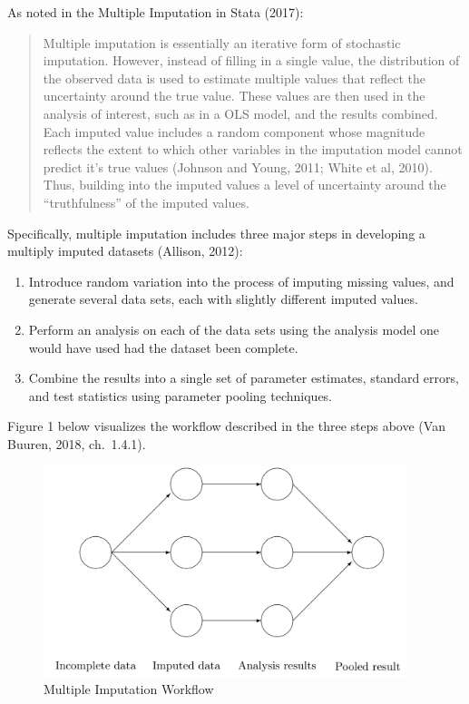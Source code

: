 \documentclass[12pt,oneside]{chicagocapstone}
\providecommand{\tightlist}{%
  \setlength{\itemsep}{0pt}\setlength{\parskip}{0pt}}
\begin{document}
As noted in the Multiple Imputation in Stata (2017):
\begin{quote}
Multiple imputation is essentially an iterative form of stochastic
imputation. However, instead of filling in a single value, the
distribution of the observed data is used to estimate multiple values
that reflect the uncertainty around the true value. These values are
then used in the analysis of interest, such as in a OLS model, and the
results combined. Each imputed value includes a random component whose
magnitude reflects the extent to which other variables in the imputation
model cannot predict it's true values (Johnson and Young, 2011; White et
al, 2010). Thus, building into the imputed values a level of uncertainty
around the ``truthfulness'' of the imputed values.
\end{quote}
Specifically, multiple imputation includes three major steps in
developing a multiply imputed datasets (Allison, 2012):
\begin{enumerate}
\def\labelenumi{\arabic{enumi}.}
\tightlist
\item
  Introduce random variation into the process of imputing missing
  values, and generate several data sets, each with slightly different
  imputed values.
\item
  Perform an analysis on each of the data sets using the analysis model
  one would have used had the dataset been complete.
\item
  Combine the results into a single set of parameter estimates, standard
  errors, and test statistics using parameter pooling techniques.
\end{enumerate}
Figure 1 below visualizes the workflow described in the three steps
above (Van Buuren, 2018, ch.~1.4.1).
\begin{figure}

{\centering \includegraphics[width=400px]{figure/multiple-imputation-workflow} 

}

\caption{Multiple Imputation Workflow}\label{fig:mutlipleimputationworkflow}
\end{figure}
\end{document}
